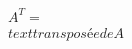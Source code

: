 \documentclass[preview]{standalone}
\begin{document}
\begin{align*}
A^T = \\text{transposée de }A
\end{align*}
\end{document}
